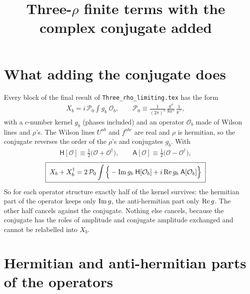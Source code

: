 \documentclass[10pt]{article}
\title{Three-$\rho$ finite terms with the complex conjugate added}
\author{}
\date{}
\numberwithin{equation}{section}
\begin{document}
\maketitle
\tableofcontents

\section{What adding the conjugate does}

Every block of the final result of \texttt{Three\_rho\_limiting.tex} has the form
\begin{align}
X_{b}=i\,\mathcal{P}_{0}\int g_{b}\;\mathcal{O}_{b},\qquad\mathcal{P}_{0}\equiv\frac{1}{(2\pi)^{3}}\,\frac{g^{4}}{8\pi^{5}}\,\frac{1}{k^{+}},
\end{align}
with a $c$-number kernel $g_{b}$ (phases included) and an operator $\mathcal{O}_{b}$ made of Wilson lines and $\rho$'s. The Wilson lines $U^{ab}$ and $f^{abc}$ are real and $\rho$ is hermitian, so the conjugate reverses the order of the $\rho$'s and conjugates $g_{b}$. With
\begin{align}
\mathsf{H}[\mathcal{O}]\equiv\tfrac12\big(\mathcal{O}+\mathcal{O}^{\dagger}\big),\qquad\mathsf{A}[\mathcal{O}]\equiv\tfrac12\big(\mathcal{O}-\mathcal{O}^{\dagger}\big),
\end{align}
\begin{align}
\boxed{\;X_{b}+X_{b}^{\dagger}=2\,\mathcal{P}_{0}\int\Big\{-{\rm Im}\,g_{b}\;\mathsf{H}[\mathcal{O}_{b}]+i\,{\rm Re}\,g_{b}\;\mathsf{A}[\mathcal{O}_{b}]\Big\}\;} \label{eq:rule}
\end{align}
So for each operator structure exactly half of the kernel survives: the hermitian part of the operator keeps only ${\rm Im}\,g$, the anti-hermitian part only ${\rm Re}\,g$. The other half cancels against the conjugate. Nothing else cancels, because the conjugate has the roles of amplitude and conjugate amplitude exchanged and cannot be relabelled into $X_{b}$.

\section{Hermitian and anti-hermitian parts of the operators}
\end{document}
